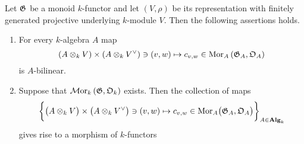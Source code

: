\begin{proposition}\label{proposition:matrix_coefficients_natural}
Let ${\mathfrak G}$ be a monoid $k$-functor and let $(V,\rho)$ be its representation with finitely generated projective underlying $k$-module $V$. Then the following assertions holds.
\begin{enumerate}[label=\emph{\textbf{(\arabic*)}}, leftmargin=3.0em]
\item For every $k$-algebra $A$ map
$$\left(A\otimes_kV\right)\times \left(A\otimes_kV^{\vee}\right)\ni (v,w)\mapsto c_{v,w}\in \mathrm{Mor}_A\left({\mathfrak G}_A,{\mathfrak O}_A\right)$$
is $A$-bilinear.
\item Suppose that $\mathcal{M}\mathrm{or}_k\left({\mathfrak G},{\mathfrak O}_k\right)$ exists. Then the collection of maps
$$\bigg\{\big(A\otimes_kV\big)\times \big(A\otimes_kV^{\vee}\big)\ni (v,w)\mapsto c_{v,w}\in \mathrm{Mor}_A\big({\mathfrak G}_A,{\mathfrak O}_A\big)\bigg\}_{A\in \mathbf{Alg}_k}$$
gives rise to a morphism of $k$-functors
\begin{center}
\end{center}
\end{enumerate}
\end{proposition}
